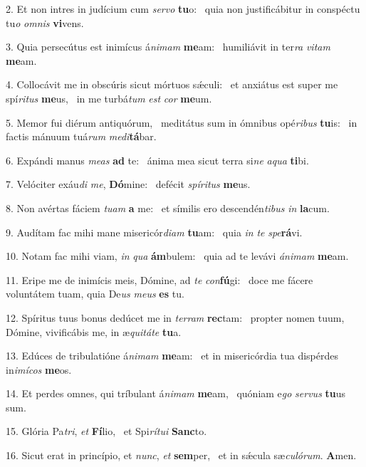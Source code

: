 2. Et non intres in judícium cum \textit{ser}\textit{vo} \textbf{tu}o: \ast\  quia non justificábitur in conspéctu tu\textit{o} \textit{om}\textit{nis} \textbf{vi}vens.\

3. Quia persecútus est inimícus á\textit{ni}\textit{mam} \textbf{me}am: \ast\  humiliávit in ter\textit{ra} \textit{vi}\textit{tam} \textbf{me}am.\

4. Collocávit me in obscúris sicut mórtuos sǽculi: \dag\  et anxiátus est super me spí\textit{ri}\textit{tus} \textbf{me}us, \ast\  in me turbá\textit{tum} \textit{est} \textit{cor} \textbf{me}um.\

5. Memor fui diérum antiquórum, \dag\  meditátus sum in ómnibus opé\textit{ri}\textit{bus} \textbf{tu}is: \ast\  in factis mánuum tuá\textit{rum} \textit{me}\textit{di}\textbf{tá}bar.\

6. Expándi manus \textit{me}\textit{as} \textbf{ad} te: \ast\  ánima mea sicut terra si\textit{ne} \textit{a}\textit{qua} \textbf{ti}bi.\

7. Velóciter exáu\textit{di} \textit{me}, \textbf{Dó}mine: \ast\  defécit \textit{spí}\textit{ri}\textit{tus} \textbf{me}us.\

8. Non avértas fáciem \textit{tu}\textit{am} \textbf{a} me: \ast\  et símilis ero descendén\textit{ti}\textit{bus} \textit{in} \textbf{la}cum.\

9. Audítam fac mihi mane misericór\textit{di}\textit{am} \textbf{tu}am: \ast\  quia \textit{in} \textit{te} \textit{spe}\textbf{rá}vi.\

10. Notam fac mihi viam, \textit{in} \textit{qua} \textbf{ám}bulem: \ast\  quia ad te levávi \textit{á}\textit{ni}\textit{mam} \textbf{me}am.\

11. Eripe me de inimícis meis, Dómine, ad \textit{te} \textit{con}\textbf{fú}gi: \ast\  doce me fácere voluntátem tuam, quia De\textit{us} \textit{me}\textit{us} \textbf{es} tu.\

12. Spíritus tuus bonus dedúcet me in \textit{ter}\textit{ram} \textbf{rec}tam: \ast\  propter nomen tuum, Dómine, vivificábis me, in æ\textit{qui}\textit{tá}\textit{te} \textbf{tu}a.\

13. Edúces de tribulatióne á\textit{ni}\textit{mam} \textbf{me}am: \ast\  et in misericórdia tua dispérdes in\textit{i}\textit{mí}\textit{cos} \textbf{me}os.\

14. Et perdes omnes, qui tríbulant á\textit{ni}\textit{mam} \textbf{me}am, \ast\  quóniam e\textit{go} \textit{ser}\textit{vus} \textbf{tu}us sum.\

15. Glória Pa\textit{tri}, \textit{et} \textbf{Fí}lio, \ast\  et Spi\textit{rí}\textit{tu}\textit{i} \textbf{Sanc}to.\

16. Sicut erat in princípio, et \textit{nunc}, \textit{et} \textbf{sem}per, \ast\  et in sǽcula sæ\textit{cu}\textit{ló}\textit{rum}. \textbf{A}men.\

